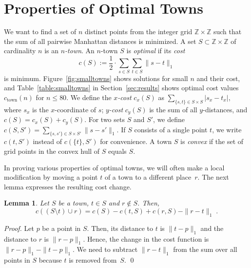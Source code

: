 \documentclass[preprint,authoryear,12pt]{elsarticle}
\newtheorem{lemma}[theorem]{Lemma}
\begin{document}
\section{Properties of Optimal Towns}\label{sec:prelim}
We want to find a set of $n$ distinct points from the integer grid
$\mathbb{Z} \times \mathbb{Z}$ such that the sum of all pairwise
Manhattan distances is minimized. A set $S \subset \mathbb{Z} \times
\mathbb{Z}$ of cardinality $n$ is an \emph{$n$-town}. An $n$-town
$S$ is \emph{optimal} if its \emph{cost} \begin{equation}
  \label{eq:c}
c(S) := \frac12 \cdot
\sum_{s \in S}
\sum_{t \in S}
 \|s-t\|_1
\end{equation}
is minimum.
Figure~\ref{fig:smalltowns} shows solutions for small $n$ and their
cost, and Table~\ref{table:smalltowns} in Section~\ref{sec:results}
 shows optimal cost values
$c_{\textrm{town}}(n)$ for $n\le80$.
 We define the \emph{$x$-cost} $c_x(S)$ as
$\sum_{\{s,t\} \in S \times S}|s_x-t_x|$, where $s_x$ is the
$x$-coordinate of $s$; \emph{$y$-cost} $c_y(S)$ is the sum of all
$y$-distances, and $c(S) = c_x(S) + c_y(S)$. For two
sets $S$ and $S'$, we define $c(S,S')=\sum_{ \{s,s'\}\in S\times
S'}\|s-s'\|_1$. If $S$ consists of a single point $t$, we write
$c(t,S')$ instead of $c(\{t\},S')$ for convenience. A town $S$ is
\emph{convex} if the set of grid points in the convex hull of $S$
equals $S$.


















In proving various properties of optimal towns, we will often make a
local modification by moving a point $t$ of a town to a different
place~$r$. The next lemma expresses the resulting cost change.


\begin{lemma}\label{lem:changecostfunc}
Let $S$ be a town, $t\in S$ and $r\notin S$. Then,
$$
c( (S\setminus t)\cup r) = c(S) - c(t,S) + c(r,S) - \|r-t\|_1 \; .
$$
\end{lemma}
\begin{proof}
Let $p$ be a point in $S$. Then, its distance to $t$ is $\|t-p\|_1$
and the distance to $r$ is $\|r-p\|_1$. Hence, the change in the
cost function is $\|r-p\|_1 - \|t-p\|_1$. We need to subtract
$\|r-t\|_1$ from the sum over all points in $S$ because $t$ is
removed from~$S$.
\qed
\end{proof}
\end{document}
